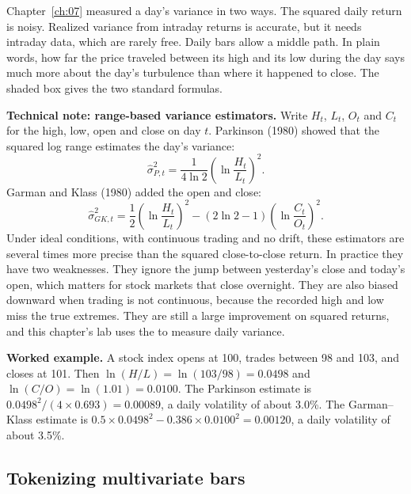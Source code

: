 Chapter~\ref{ch:07} measured a day's variance in two ways. The squared daily return is noisy. Realized variance from intraday returns is accurate, but it needs intraday data, which are rarely free. Daily bars allow a middle path. In plain words, how far the price traveled between its high and its low during the day says much more about the day's turbulence than where it happened to close. The shaded box gives the two standard formulas.

\begin{technote}
\textbf{Technical note: range-based variance estimators.} Write $H_t$, $L_t$, $O_t$ and $C_t$ for the high, low, open and close on day $t$. Parkinson (1980) showed that the squared log range estimates the day's variance:
\begin{equation}
  \hat\sigma^2_{P,t} = \frac{1}{4 \ln 2} \left(\ln \frac{H_t}{L_t}\right)^2.
  \label{eq:23-parkinson}
\end{equation}
Garman and Klass (1980) added the open and close:
\begin{equation}
  \hat\sigma^2_{GK,t} = \frac{1}{2} \left(\ln \frac{H_t}{L_t}\right)^2 - \left(2\ln 2 - 1\right) \left(\ln \frac{C_t}{O_t}\right)^2.
  \label{eq:23-gk}
\end{equation}
Under ideal conditions, with continuous trading and no drift, these estimators are several times more precise than the squared close-to-close return. In practice they have two weaknesses. They ignore the jump between yesterday's close and today's open, which matters for stock markets that close overnight. They are also biased downward when trading is not continuous, because the recorded high and low miss the true extremes. They are still a large improvement on squared returns, and this chapter's lab uses the  to measure daily variance.
\end{technote}

\textbf{Worked example.} A stock index opens at 100, trades between 98 and 103, and closes at 101. Then $\ln(H/L) = \ln(103/98) = 0.0498$ and $\ln(C/O) = \ln(1.01) = 0.0100$. The Parkinson estimate is $0.0498^2/(4 \times 0.693) = 0.00089$, a daily volatility of about 3.0\%. The Garman--Klass estimate is $0.5 \times 0.0498^2 - 0.386 \times 0.0100^2 = 0.00120$, a daily volatility of about 3.5\%.

\subsection{Tokenizing multivariate bars}

